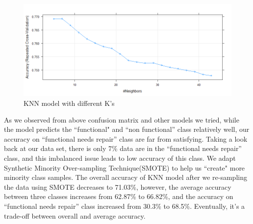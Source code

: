 \begin{figure}[h]
    \centering
    \includegraphics[width = \textwidth]{Figures/knnplot.png}
    \caption{KNN model with different K's}
    \label{fig:knn_k}
\end{figure}

As we observed from above confusion matrix and other models we tried, while the model predicts the ``functional" and ``non functional'' class relatively well, our accuracy on ``functional needs repair'' class are far from satisfying. Taking a look back at our data set, there is only 7\% data are in the ``functional needs repair'' class, and this imbalanced issue leads to low accuracy of this class. We adapt Synthetic Minority Over-sampling Technique(SMOTE) to help us ``create" more minority class samples. The overall accuracy of KNN model after we re-sampling the data using SMOTE decreases to 71.03\%, however, the average accuracy between three classes increases from 62.87\% to 66.82\%, and the accuracy on ``functional needs repair'' class increased from 30.3\% to 68.5\%. Eventually, it's a trade-off between overall and average accuracy. 